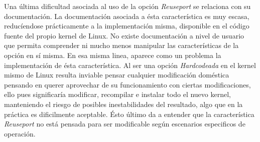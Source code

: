 Una última dificultad asociada al uso de la opción \emph{Reuseport} se relaciona con su documentación. La documentación asociada a ésta característica es muy escasa, reducíendose prácticamente a la implementación misma, disponible en el código fuente del propio kernel de Linux. No existe documentación a nivel de usuario que permita comprender ni mucho menos manipular las características de la opción en sí misma. En esa misma linea, aparece como un problema la implementación de ésta característica. Al ser una opción \emph{Hardcodeada} en el kernel mismo de Linux resulta inviable pensar cualquier modificación doméstica pensando en querer aprovechar de su funcionamiento con ciertas modificaciones, ello pues significaría modificar, recompilar e instalar todo el nuevo kernel, manteniendo el riesgo de posibles inestabilidades del resultado, algo que en la práctica es dificilmente aceptable. Ésto último da a entender que la característica \emph{Reuseport} no está pensada para ser modificable según escenarios especificos de operación.